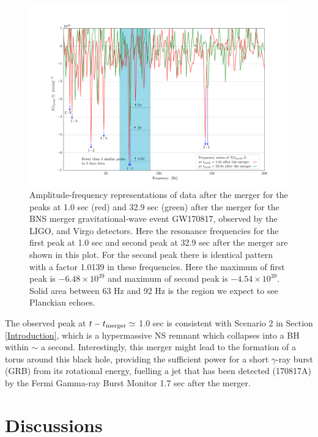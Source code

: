 \documentclass[a4paper,11pt]{article}
\begin{document}
\begin{figure}[!tbp]
    \includegraphics[width=1\textwidth]{peaks_in_frequency.pdf}
 \caption{Amplitude-frequency representations of data after the merger for the peaks at 1.0 sec (red) and 32.9 sec (green) after the merger for the BNS merger gravitational-wave event GW170817, observed by the LIGO, and Virgo detectors. Here the resonance frequencies for the first peak at 1.0 sec and second peak at 32.9 sec after the merger are shown in this plot. For the second peak there is identical pattern with a factor 1.0139 in these frequencies. Here the maximum of first peak is $-6.48\times10^{39}$ and maximum of second peak is $-4.54 \times 10^{39}$. Solid area between 63 Hz and 92 Hz is the region we expect to see Planckian echoes.}
 \label{NS-NS_3}
\end{figure}

The observed peak at $t-t_{\rm{merger}} \simeq$ 1.0 sec is consistent with Scenario 2 in Section \ref{Introduction}, which is a hypermassive NS remnant \cite{Abbott:2017dke} which collapses into a BH within $\sim$ a second. Interestingly, this merger might lead to the formation of a torus around this black hole, providing the sufficient power for a short $\gamma$-ray burst (GRB) \cite{Kastaun:2013mv} from its rotational energy, fuelling a jet that has been detected (170817A) by the Fermi Gamma-ray Burst Monitor \cite{Goldstein:2017mmi,Monitor:2017mdv} 1.7 sec after the merger.

\section{\label{discuss} Discussions} 
\end{document}
